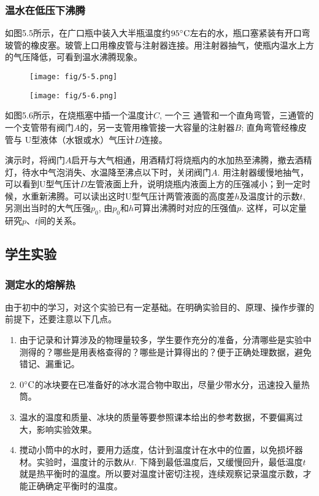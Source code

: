 \subsubsection{温水在低压下沸腾}
如图5.5所示，在广口瓶中装入大半瓶温度约$95^{\circ}{\rm C}$左右的水，瓶口塞紧装有开口弯玻管的橡皮塞。玻管上口用橡皮管与注射器连接。用注射器抽气，使瓶内温水上方的气压降低，可看到温水沸腾现象。
\begin{figure}[htp]\centering
    \begin{minipage}[t]{0.48\textwidth}
    \centering
\texttt{[image: fig/5-5.png]}
    \caption{}
    \end{minipage}
    \begin{minipage}[t]{0.48\textwidth}
    \centering
\texttt{[image: fig/5-6.png]}
    \caption{}
    \end{minipage}
    \end{figure}

如图5.6所示，在烧瓶塞中插一个温度计$C$, 一个三
通管和一个直角弯管，三通管的一个支管带有阀门$A$的，另一支管用橡管接一大容量的注射器$B$; 直角弯管经橡皮管与
U型液体（水银或水）气压计$D$连接。

演示时，将阀门$A$启开与大气相通，用酒精灯将烧瓶内的水加热至沸腾，撤去酒精灯，待水中气泡消失、水温降至沸点以下时，关闭阀门$A$. 用注射器缓慢地抽气，可以看到U型气压计$D$左管液面上升，说明烧瓶内液面上方的压强减小；到一定时候，水重新沸腾。可以读出这时U型气压计两管液面的高度差$h$及温度计的示数$t$, 另测出当时的大气压强$p_0$, 由$p_0$和$h$可算出沸腾时对应的压强值$p$. 这样，可以定量研究$p$、$t$间的关系。

\subsection{学生实验}
\subsubsection{测定水的熔解热}

由于初中的学习，对这个实验已有一定基础。在明确实验目的、原理、操作步骤的前提下，还要注意以下几点。
\begin{enumerate}
\item 由于记录和计算涉及的物理量较多，学生要作充分的准备，分清哪些是实验中测得的？哪些是用表格查得的？哪些是计算得出的？便于正确处理数据，避免错记、漏重记。
\item $0^{\circ}{\rm C}$的冰块要在已准备好的冰水混合物中取出，尽量少带水分，迅速投入量热筒。
\item 温水的温度和质量、冰块的质量等要参照课本给出的参考数据，不要偏离过大，影响实验效果。
\item 搅动小筒中的水时，要用力适度，估计到温度计在水中的位置，以免损坏器材。实验时，温度计的示数从$t$. 下降到最低温度后，又缓慢回升，最低温度$t$就是热平衡时的温度。所以要对温度计密切注视，连续观察记录温度示数，才能正确确定平衡时的温度。
\end{enumerate}

